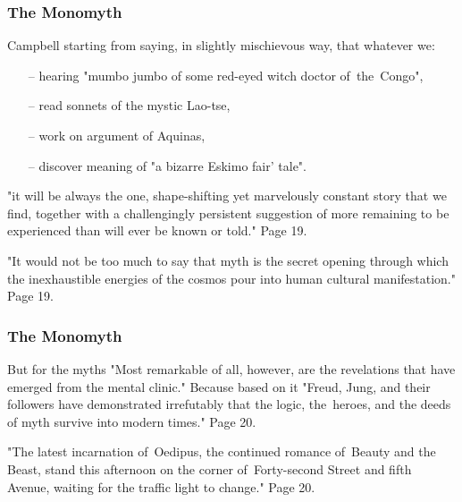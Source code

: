 \documentclass{beamer}  %
\begin{document}
\begin{frame}
  \frametitle{The Monomyth}

  \begin{block}{}
    Campbell starting from saying, in slightly mischievous way, that
    whatever we:
    \begin{itemize}
    \item[--] hearing "mumbo jumbo of some red-eyed witch doctor
      of~the~Congo",
    \item[--] read sonnets of the mystic Lao-tse,
    \item[--] work on argument of Aquinas,
    \item[--] discover meaning of "a bizarre Eskimo fair' tale".
    \end{itemize}
    "it will be always the one, shape-shifting yet marvelously
    constant story that we find, together with a challengingly
    persistent suggestion of more remaining to be experienced than
    will ever be known or told." Page 19.
  \end{block}
  \pause

  \begin{block}{}
    "It would not be too much to say that myth is the secret opening
    through which the inexhaustible energies of the cosmos pour into
    human cultural manifestation." Page 19.
  \end{block}

\end{frame}



\begin{frame}
  \frametitle{The Monomyth}

  \begin{block}{But for the myths}
    "Most remarkable of all, however, are the revelations that have
    emerged from the mental clinic." Because based on it "Freud, Jung,
    and their followers have demonstrated irrefutably that the logic,
    the~heroes, and the deeds of myth survive into modern times." Page
    20.
  \end{block}
  \pause

  \begin{block}{}
    "The latest incarnation of~Oedipus, the continued romance
    of~Beauty and the Beast, stand this afternoon on the corner
    of~Forty-second Street and fifth Avenue, waiting for the traffic
    light to change." Page 20.
  \end{block}

  \begin{block}{I can only replay}
    \begin{figure}
      \centering \texttt{[image: Stroke]}
      \begin{captation}
      \end{figure}}
  \end{block}

\end{frame}
\end{document}
